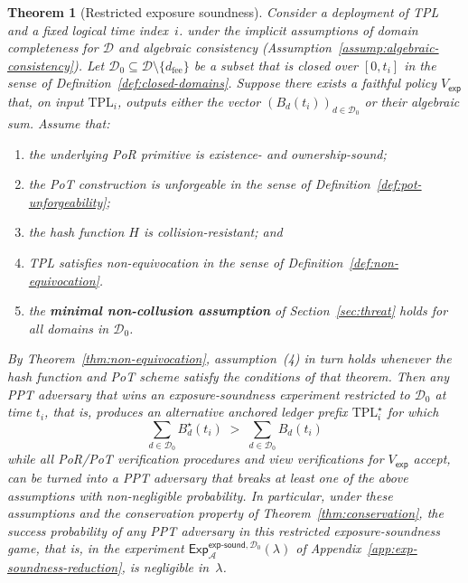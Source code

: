 \documentclass[11pt]{article}
\newtheorem{theorem}{Theorem}
\begin{document}
\begin{theorem}[Restricted exposure soundness]
\label{lem:restricted-exp-soundness}
Consider a deployment of TPL and a fixed logical time index~$i$. under the implicit assumptions of domain completeness for $\mathcal{D}$ and algebraic consistency (Assumption~\ref{assump:algebraic-consistency}).
Let $\mathcal{D}_0 \subseteq \mathcal{D} \setminus \{d_{\mathrm{fee}}\}$ be a subset that is \emph{closed over $[0,t_i]$}
in the sense of Definition~\ref{def:closed-domains}.
Suppose there exists a faithful policy $V_{\mathsf{exp}}$ that, on input $\mathrm{TPL}_i$,
outputs either the vector $(B_d(t_i))_{d \in \mathcal{D}_0}$ or their algebraic sum.
Assume that:
\begin{enumerate}[noitemsep]
  \item the underlying PoR primitive is existence- and ownership-sound;
  \item the PoT construction is unforgeable in the sense of Definition~\ref{def:pot-unforgeability};
  \item the hash function $H$ is collision-resistant; and
  \item TPL satisfies non-equivocation in the sense of Definition~\ref{def:non-equivocation}.
  \item the \textbf{minimal non-collusion assumption} of Section~\ref{sec:threat} holds for all domains in $\mathcal{D}_0$.
\end{enumerate}
By Theorem~\ref{thm:non-equivocation}, assumption~(4) in turn holds whenever the hash function and PoT scheme satisfy
the conditions of that theorem.
Then any PPT adversary that wins an exposure-soundness experiment restricted to $\mathcal{D}_0$ at time $t_i$, that is,
produces an alternative anchored ledger prefix $\mathrm{TPL}^\star_i$ for which
\[
  \sum_{d \in \mathcal{D}_0} B^\star_d(t_i)
  \;>\;
  \sum_{d \in \mathcal{D}_0} B_d(t_i)
\]
while all PoR/PoT verification procedures and view verifications for $V_{\mathsf{exp}}$ accept, can be turned into a PPT
adversary that breaks at least one of the above assumptions with non-negligible probability.
In particular, under these assumptions and the conservation property of Theorem~\ref{thm:conservation}, the success
probability of any PPT adversary in this restricted exposure-soundness game, that is, in the experiment $\mathsf{Exp}^{\mathsf{exp\mbox{-}sound},\mathcal{D}_0}_{\mathcal{A}}(\lambda)$ of Appendix~\ref{app:exp-soundness-reduction}, is negligible in~$\lambda$.
\end{theorem}
\end{document}

